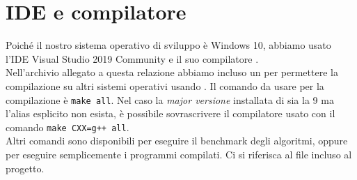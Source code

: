 \section{IDE e compilatore}
\label{cap:language-choice}

Poiché il nostro sistema operativo di sviluppo è Windows 10, abbiamo usato l'IDE Visual Studio 2019 Community e il suo compilatore . \\

\noindent Nell'archivio allegato a questa relazione abbiamo incluso un  per permettere la compilazione su altri sistemi operativi usando . Il comando da usare per la compilazione è \texttt{make all}. Nel caso la \textit{major versione} installata di  sia la 9 ma l'alias esplicito  non esista, è possibile sovrascrivere il compilatore usato con il comando \texttt{make CXX=g++ all}. \\

\noindent Altri comandi sono disponibili per eseguire il benchmark degli algoritmi, oppure per eseguire semplicemente i programmi compilati. Ci si riferisca al file  incluso al progetto.
